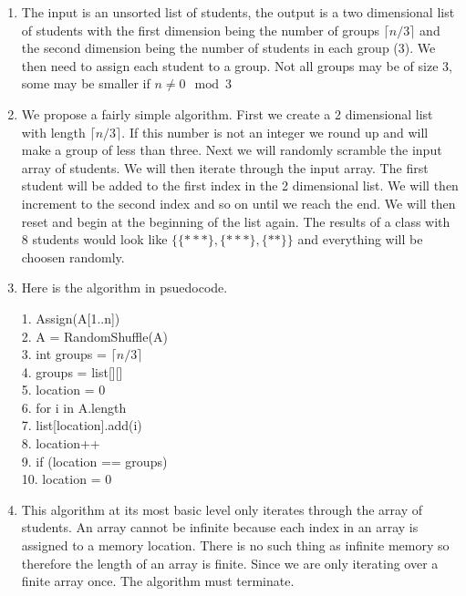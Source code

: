 \documentclass{article}
\begin{document}
\begin{enumerate}
	\item The input is an unsorted list of students, the output is a two dimensional list of students with the first dimension being the number of groups $\lceil n/3 \rceil$ and the second dimension being the number of students in each group (3). We then need to assign each student to a group. Not all groups may be of size 3, some may be smaller if $n \neq 0 \mod 3$
	\item We propose a fairly simple algorithm. First we create a 2 dimensional list with length $\lceil n/3 \rceil$. If this number is not an integer we round up and will make a group of less than three. Next we will randomly scramble the input array of students. We will then iterate through the input array. The first student will be added to the first index in the 2 dimensional list. We will then increment to the second index and so on until we reach the end. We will then reset and begin at the beginning of the list again. The results of a class with 8 students would look like $\{\{***\},\{***\},\{**\}\}$ and everything will be choosen randomly.
	\item Here is the algorithm in psuedocode.
	\begin{algorithm}
    	1. Assign(A[1..n]) \\
    	2. \hspace{2em}	A = RandomShuffle(A) \\
    	3. \hspace{2em}	int groups = $\lceil n/3 \rceil$ \\
    	4. \hspace{2em}	groups = list[][] \\
    	5. \hspace{2em}	location = 0 \\
    	6. \hspace{2em}	for i in A.length \\
    	7. \hspace{4em}	list[location].add(i) \\
    	8.\hspace{4em}		location++ \\
    	9.\hspace{2em}		if (location == groups) \\
    	10.\hspace{4em}			location = 0
    \end{algorithm}
	\item This algorithm at its most basic level only iterates through the array of students. An array cannot be infinite because each index in an array is assigned to a memory location. There is no such thing as infinite memory so therefore the length of an array is finite. Since we are only iterating over a finite array once. The algorithm must terminate.
\end{enumerate}
\end{document}
